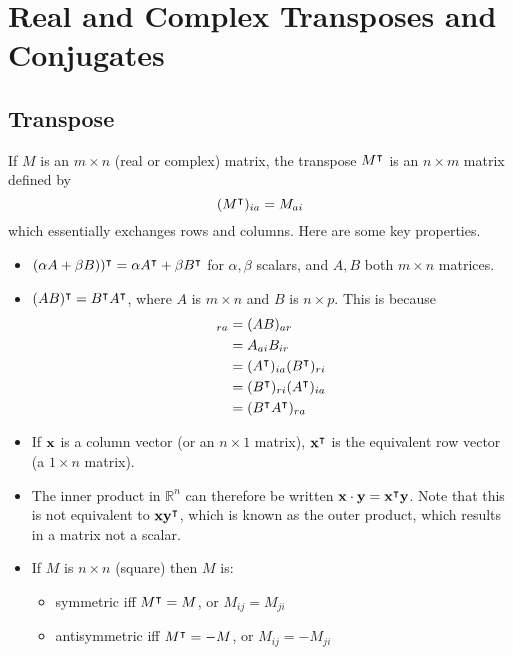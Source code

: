 \documentclass{article}
\begin{document}
\section{Real and Complex Transposes and Conjugates}
\subsection{Transpose}
If $M$ is an $m \times n$ (real or complex) matrix, the transpose $M^\intercal$ is an $n \times m$ matrix defined by
\[ (M^\intercal)_{ia} = M_{ai} \]
which essentially exchanges rows and columns. Here are some key properties.
\begin{itemize}
    \item $(\alpha A + \beta B))^\intercal = \alpha A^\intercal + \beta B^\intercal$ for $\alpha, \beta$ scalars, and $A, B$ both $m \times n$ matrices.
    \item $(AB)^\intercal = B^\intercal A^\intercal$, where $A$ is $m \times n$ and $B$ is $n \times p$. This is because
          \begin{align*}
              [(AB)^\transpose]_{ra} & = (AB)_{ar}                               \\
                                     & = A_{ai} B_{ir}                           \\
                                     & = (A^\transpose)_{ia} (B^\transpose)_{ri} \\
                                     & = (B^\transpose)_{ri} (A^\transpose)_{ia} \\
                                     & = (B^\transpose A^\transpose)_{ra}
          \end{align*}
    \item If $\vb x$ is a column vector (or an $n \times 1$ matrix), $\vb x^\intercal$ is the equivalent row vector (a $1 \times n$ matrix).
    \item The inner product in $\mathbb R^n$ can therefore be written $\vb x \cdot \vb y = \vb x^\intercal \vb y$. Note that this is not equivalent to $\vb x \vb y^\intercal$, which is known as the outer product, which results in a matrix not a scalar.
    \item If $M$ is $n \times n$ (square) then $M$ is:
          \begin{itemize}
              \item symmetric iff $M^\intercal = M$, or $M_{ij} = M_{ji}$
              \item antisymmetric iff $M^\intercal = -M$, or $M_{ij} = -M_{ji}$

\end{itemize}
\end{itemize}
\end{document}
